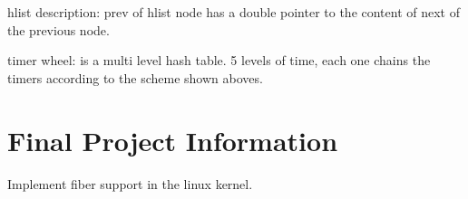 \documentclass[twoside]{article}
\begin{document}
hlist description: prev of hlist node has a double pointer to the content of
next of the previous node.

timer wheel: is a multi level hash table. 5 levels of time, each one chains the
timers according to the scheme shown aboves.

\section{Final Project Information}
\label{sec:Final Project Information}

Implement fiber support in the linux kernel.


\newpage


\end{document}
